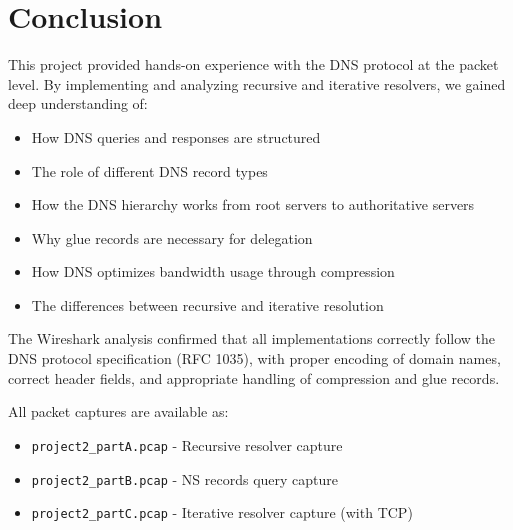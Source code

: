 \documentclass[11pt,letterpaper]{article}
\begin{document}
\newpage

\section{Conclusion}

This project provided hands-on experience with the DNS protocol at the packet level. By implementing and analyzing recursive and iterative resolvers, we gained deep understanding of:

\begin{itemize}
    \item How DNS queries and responses are structured
    \item The role of different DNS record types
    \item How the DNS hierarchy works from root servers to authoritative servers
    \item Why glue records are necessary for delegation
    \item How DNS optimizes bandwidth usage through compression
    \item The differences between recursive and iterative resolution
\end{itemize}

The Wireshark analysis confirmed that all implementations correctly follow the DNS protocol specification (RFC 1035), with proper encoding of domain names, correct header fields, and appropriate handling of compression and glue records.

All packet captures are available as:
\begin{itemize}
    \item \texttt{project2\_partA.pcap} - Recursive resolver capture
    \item \texttt{project2\_partB.pcap} - NS records query capture
    \item \texttt{project2\_partC.pcap} - Iterative resolver capture (with TCP)
\end{itemize}
\end{document}
